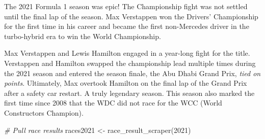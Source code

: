 \documentclass[
]{book}
\newenvironment{Shaded}{\begin{snugshade}}{\end{snugshade}}
\newcommand{\CommentTok}[1]{\textcolor[rgb]{0.56,0.35,0.01}{\textit{#1}}}
\newcommand{\DecValTok}[1]{\textcolor[rgb]{0.00,0.00,0.81}{#1}}
\newcommand{\FunctionTok}[1]{\textcolor[rgb]{0.00,0.00,0.00}{#1}}
\newcommand{\NormalTok}[1]{#1}
\newcommand{\OtherTok}[1]{\textcolor[rgb]{0.56,0.35,0.01}{#1}}
\begin{document}
The 2021 Formula 1 season was epic! The Championship fight was not settled until the final lap of the season. Max Verstappen won the Drivers' Championship for the first time in his career and became the first non-Mercedes driver in the turbo-hybrid era to win the World Championship.

Max Verstappen and Lewis Hamilton engaged in a year-long fight for the title. Verstappen and Hamilton swapped the championship lead multiple times during the 2021 season and entered the season finale, the Abu Dhabi Grand Prix, \emph{tied on points}. Ultimately, Max overtook Hamilton on the final lap of the Grand Prix after a safety car restart. A truly legendary season. This season also marked the first time since 2008 that the WDC did not race for the WCC (World Constructors Champion).

\begin{Shaded}
\begin{Highlighting}[]
\CommentTok{\# Pull race results}
\NormalTok{races2021 }\OtherTok{\textless{}{-}} \FunctionTok{race\_result\_scraper}\NormalTok{(}\DecValTok{2021}\NormalTok{)}


\end{Highlighting}
\end{Shaded}
\end{document}
